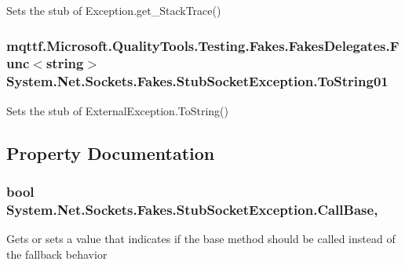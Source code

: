 Sets the stub of Exception.\-get\-\_\-\-Stack\-Trace()

\hypertarget{class_system_1_1_net_1_1_sockets_1_1_fakes_1_1_stub_socket_exception_a9a34ecf6f670a8c503dede3bc987a7d7}{
\subsubsection[{To\-String01}]{\setlength{\rightskip}{0pt plus 5cm}mqttf.\-Microsoft.\-Quality\-Tools.\-Testing.\-Fakes.\-Fakes\-Delegates.\-Func$<$string$>$ System.\-Net.\-Sockets.\-Fakes.\-Stub\-Socket\-Exception.\-To\-String01}}\label{class_system_1_1_net_1_1_sockets_1_1_fakes_1_1_stub_socket_exception_a9a34ecf6f670a8c503dede3bc987a7d7}


Sets the stub of External\-Exception.\-To\-String()



\subsection{Property Documentation}
\hypertarget{class_system_1_1_net_1_1_sockets_1_1_fakes_1_1_stub_socket_exception_a7552ff7e557f6426af0e23c08d0dc548}{
\subsubsection[{Call\-Base}]{\setlength{\rightskip}{0pt plus 5cm}bool System.\-Net.\-Sockets.\-Fakes.\-Stub\-Socket\-Exception.\-Call\-Base\hspace{0.3cm}{\ttfamily [get]}, {\ttfamily [set]}}}\label{class_system_1_1_net_1_1_sockets_1_1_fakes_1_1_stub_socket_exception_a7552ff7e557f6426af0e23c08d0dc548}


Gets or sets a value that indicates if the base method should be called instead of the fallback behavior

